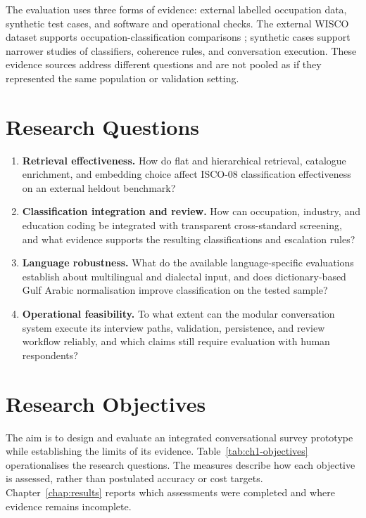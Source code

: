 The evaluation uses three forms of evidence: external labelled occupation
data, synthetic test cases, and software and operational checks. The
external WISCO dataset supports occupation-classification comparisons
\cite{wisco2023}; synthetic cases support narrower studies of classifiers,
coherence rules, and conversation execution. These evidence sources
address different questions and are not pooled as if they represented
the same population or validation setting.

\section{Research Questions}
\label{sec:research-questions}

\begin{enumerate}[label=\textbf{RQ\arabic*.}, leftmargin=3.1em]
  \item \textbf{Retrieval effectiveness.} How do flat and hierarchical
  retrieval, catalogue enrichment, and embedding choice affect ISCO-08
  classification effectiveness on an external heldout benchmark?

  \item \textbf{Classification integration and review.} How can occupation,
  industry, and education coding be integrated with transparent
  cross-standard screening, and what evidence supports the resulting
  classifications and escalation rules?

  \item \textbf{Language robustness.} What do the available language-specific
  evaluations establish about multilingual and dialectal input, and does
  dictionary-based Gulf Arabic normalisation improve classification on
  the tested sample?

  \item \textbf{Operational feasibility.} To what extent can the modular
  conversation system execute its interview paths, validation, persistence,
  and review workflow reliably, and which claims still require evaluation
  with human respondents?
\end{enumerate}

\section{Research Objectives}
\label{sec:objectives}

The aim is to design and evaluate an integrated conversational survey
prototype while establishing the limits of its evidence.
Table~\ref{tab:ch1-objectives} operationalises the research questions.
The measures describe how each objective is assessed, rather than
postulated accuracy or cost targets. Chapter~\ref{chap:results} reports
which assessments were completed and where evidence remains incomplete.

